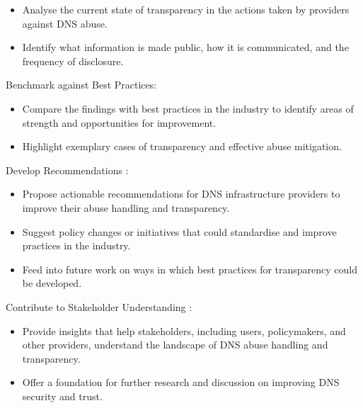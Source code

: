 \begin{itemize}
  \item Analyse the current state of transparency in the actions taken by providers against DNS abuse.
  \item Identify what information is made public, how it is communicated, and the frequency of disclosure.
\end{itemize}

Benchmark against Best Practices:

\begin{itemize}
  \item Compare the findings with best practices in the industry to identify areas of strength and opportunities for improvement.
  \item Highlight exemplary cases of transparency and effective abuse mitigation.
\end{itemize}

Develop Recommendations :

\begin{itemize}
  \item Propose actionable recommendations for DNS infrastructure providers to improve their abuse handling and transparency.
  \item Suggest policy changes or initiatives that could standardise and improve practices in the industry.
  \item Feed into future work on ways in which best practices for transparency could be developed.
\end{itemize}

Contribute to Stakeholder Understanding : 

\begin{itemize}
  \item Provide insights that help stakeholders, including users, policymakers, and other providers, understand the landscape of DNS abuse handling and transparency.
  \item Offer a foundation for further research and discussion on improving DNS security and trust.
\end{itemize}

